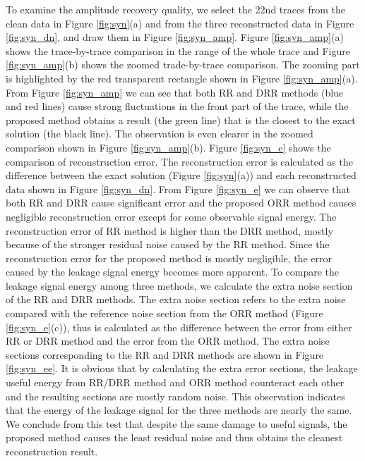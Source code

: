 To examine the amplitude recovery quality, we select the 22nd traces from the clean data in Figure \ref{fig:syn}(a) and from the three reconstructed data in Figure \ref{fig:syn_dn}, and draw them in Figure \ref{fig:syn_amp}. Figure \ref{fig:syn_amp}(a) shows the trace-by-trace comparison in the range of the whole trace and Figure \ref{fig:syn_amp}(b) shows the zoomed trade-by-trace comparison. The zooming part is highlighted by the red transparent rectangle shown in Figure \ref{fig:syn_amp}(a). From Figure \ref{fig:syn_amp} we can see that both RR and DRR methods (blue and red lines) cause strong fluctuations in the front part of the trace, while the proposed method obtains a result (the green line) that is the closest to the exact solution (the black line). The observation is even clearer in the zoomed comparison shown in Figure \ref{fig:syn_amp}(b). Figure \ref{fig:syn_e} shows the comparison of reconstruction error. The reconstruction error is calculated as the difference between the exact solution (Figure \ref{fig:syn}(a)) and each reconstructed data shown in Figure \ref{fig:syn_dn}. From Figure \ref{fig:syn_e} we can observe that both RR and DRR cause significant error and the proposed ORR method causes negligible reconstruction error except for some observable signal energy. The reconstruction error of RR method is higher than the DRR method, mostly because of the stronger residual noise caused by the RR method. Since the reconstruction error for the proposed method is mostly negligible, the error caused by the leakage signal energy becomes more apparent. To compare the leakage signal energy among three methods, we calculate the extra noise section of the RR and DRR methods. The extra noise section refers to the extra noise compared with the reference noise section from the ORR method (Figure \ref{fig:syn_e}(c)), thus is calculated as the difference between the error from either RR or DRR method and the error from the ORR method. The extra noise sections corresponding to the RR and DRR methods are shown in Figure \ref{fig:syn_ee}. It is obvious that by calculating the extra error sections, the leakage useful energy from RR/DRR method and ORR method counteract each other and the resulting sections are mostly random noise. This observation indicates that the energy of the leakage signal for the three methods are nearly the same. We conclude from this test that despite the same damage to useful signals, the proposed method causes the least residual noise and thus obtains the cleanest reconstruction result.

